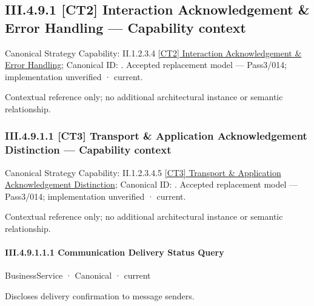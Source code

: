 \subsection*{III.4.9.1 [CT2] Interaction Acknowledgement \& Error Handling — Capability context}
\label{navigation:III.4.9.1}

{\small Canonical Strategy Capability: II.1.2.3.4 \hyperref[element:8bbc1201d917421ba7597aa341e850b6]{[CT2] Interaction Acknowledgement \& Error Handling}; Canonical ID: \texttt{}. Accepted replacement model — Pass3/014; implementation unverified · current.}\par
Contextual reference only; no additional architectural instance or semantic relationship.\par
\subsubsection*{III.4.9.1.1 [CT3] Transport \& Application Acknowledgement Distinction — Capability context}
\label{navigation:III.4.9.1.1}

{\small Canonical Strategy Capability: II.1.2.3.4.5 \hyperref[element:f726b4cecd714ab084e6cce3b0874e85]{[CT3] Transport \& Application Acknowledgement Distinction}; Canonical ID: \texttt{}. Accepted replacement model — Pass3/014; implementation unverified · current.}\par
Contextual reference only; no additional architectural instance or semantic relationship.\par
\paragraph*{III.4.9.1.1.1 Communication Delivery Status Query}
\label{navigation:III.4.9.1.1.1}

\label{element:1b3447db9891406b951f6a6ccf20763e}
{\small BusinessService · Canonical · current}\par

Discloses delivery confirmation to message senders.


